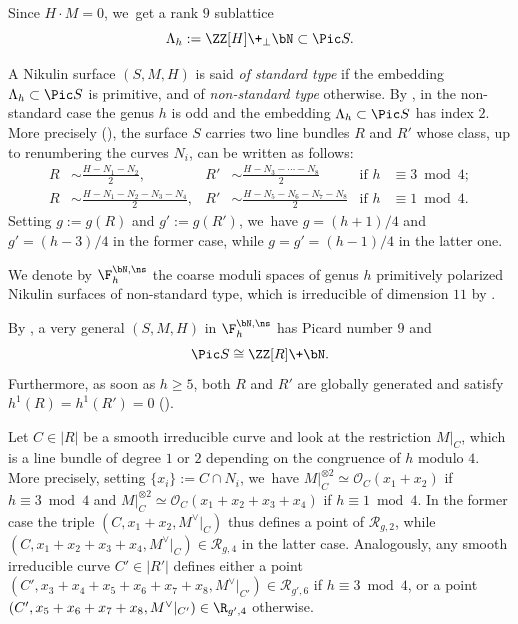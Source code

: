 Since $H\cdot M=0$, we~get a rank $9$ sublattice
\[
 \Lambda_h:= \ZZ[H] \+_{\perp} \bN \subset \Pic S.
\]

A Nikulin surface $(S,M,H)$ is said {\it of standard type} if the embedding $\Lambda_h \subset \Pic S$ is primitive, and of {\it non-standard type} otherwise. By \cite[Prop.\,2.2]{vGS}, in the non-standard case the genus $h$ is odd and the embedding $\Lambda_h \subset \Pic S$ has index $2$. More precisely (\cf \cite[Prop.\,2.1 \& Cor.\,2.1]{GS}), the surface $S$ carries two line bundles $R$ and $R'$ whose class, up to renumbering the curves $N_i$, can be written as follows:
\begin{align*}
R&\sim \frac{H-N_1-N_2}{2},&R'&\sim\frac{H-N_3-\cdots-N_8 }{2}&\text{if } h &\equiv 3 \bmod 4;
\\
R&\sim \frac{H-N_1-N_2-N_3-N_4}{2},&R'&\sim \frac{H-N_5-N_6-N_7-N_8}{2}&\text{if } h &\equiv 1 \bmod 4.
\end{align*}
Setting $g:=g(R)$ and $g':=g(R')$, we~have $g=(h+1)/4$ and $g'=(h-3)/4$ in the former case, while $g=g'=(h-1)/4$ in the latter one.

We denote by $\F_h^{\bN,\ns}$ the coarse moduli spaces of genus $h$ primitively polarized Nikulin surfaces of non-standard type, which is irreducible of dimension $11$ by \hbox{\cite[\S 3]{Do}}.

By \cite[Prop.\,2.1 \& Cor.\,2.1]{GS}, a very general $(S,M,H)$ in $\F_h^{\bN,\ns}$ has Picard number $9$ and
\begin{equation}
\label{eq:pic9}
\Pic S \cong \ZZ[R] \+ \bN.
\end{equation}
Furthermore, as soon as $h\geq 5$, both $R$ and $R'$ are globally generated and satisfy $h^1(R)=h^1(R')=0$ (\cf \cite[Prop.\,2.3(i)]{KLV2}).

Let $C\in |R|$ be a smooth irreducible curve and look at the restriction $M|_C$, which is a line bundle of degree $1$ or $2$ depending on the congruence of $h$ modulo $4$. More precisely, setting $\{x_i\}:=C\cap N_i$, we~have $M|_C^{\otimes 2}\simeq \mathcal O_C(x_1+x_2)$ if $h \equiv 3 \bmod 4$ and $M|_C^{\otimes 2}\simeq \mathcal O_C(x_1+x_2+x_3+x_4)$ if $h \equiv 1 \bmod 4$. In the former case the triple $(C,x_1+x_2,M^\vee|_C)$ thus defines a point of $\mathcal R_{g,2}$, while $(C,x_1+x_2+x_3+x_4,M^\vee|_C)\in\mathcal R_{g,4}$ in the latter case. Analogously, any smooth irreducible curve $C'\in |R'|$ defines either a point $(C', x_3+x_4+x_5+x_6+x_7+x_8,M^\vee|_{C'})\in \mathcal R_{g',6}$ if $h \equiv 3 \bmod 4$, or a point $(C',x_5+x_6+x_7+x_8,M^\vee|_{C'})\in\R_{g',4}$ otherwise.

